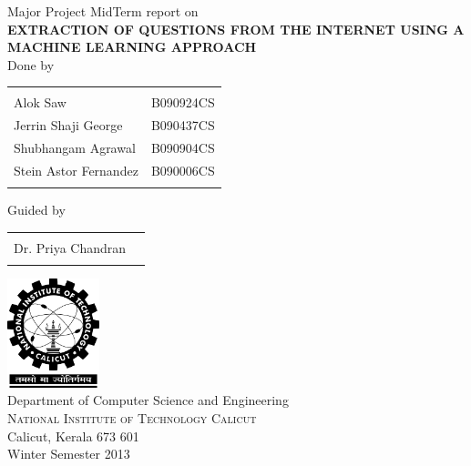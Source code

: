 \documentclass[10pt,a4paper]{report}
\begin{document}
\renewcommand\bibname{References} %

\begin{titlepage}

\begin{center}

\textup{\large Major Project MidTerm report on}\\[1.0cm]

\uppercase{\Large \textbf {Extraction of Questions from the Internet using a Machine Learning approach}}\\[3.0cm]

\normalsize Done by \\
\begin{table}[h]
\centering
\begin{tabular}{lr}\hline \\
Alok Saw & B090924CS \\ 
Jerrin Shaji George & B090437CS \\ 
Shubhangam Agrawal & B090904CS \\ 
Stein Astor Fernandez & B090006CS \\ \\ \hline 

\end{tabular}
\end{table}

\normalsize Guided by \\ 
\begin{table}[h]
\centering
\begin{tabular}{lr}\hline \\
Dr. Priya Chandran \\ \\ \hline

\end{tabular}
\end{table}

\vfill

\includegraphics[width=0.20\textwidth]{./nitc-logo}\\[1cm]
\LARGE{Department of Computer Science and Engineering}\\
\normalsize
\textsc{National Institute of Technology Calicut}\\
Calicut, Kerala 673 601 \\
\vspace{0.5cm}
Winter Semester 2013

\end{center}

\end{titlepage}
\end{document}
